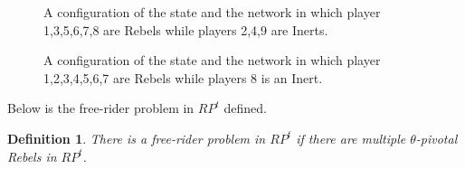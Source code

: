 \documentclass[12pt,letter]{article}
\newtheorem{definition}{Definition}[section]
\theoremstyle{definition}
\theoremstyle{remark}
\theoremstyle{claim}
\begin{document}
\begin{figure}
\caption{A configuration of the state and the network in which player 1,3,5,6,7,8 are Rebels while players 2,4,9 are Inerts.}
\label{fig:central_pivotal}
\begin{center}
\end{center}
\end{figure}

\begin{figure}
\caption{A configuration of the state and the network in which player 1,2,3,4,5,6,7 are Rebels while players 8 is an Inert.}
\label{fig:k-1_pivotal}
\begin{center}
\end{center}
\end{figure}

Below is the free-rider problem in $RP^t$ defined.

\begin{definition}
There is a free-rider problem in $RP^t$ if there are multiple $\theta$-pivotal Rebels in $RP^t$.
\end{definition}
\end{document}
